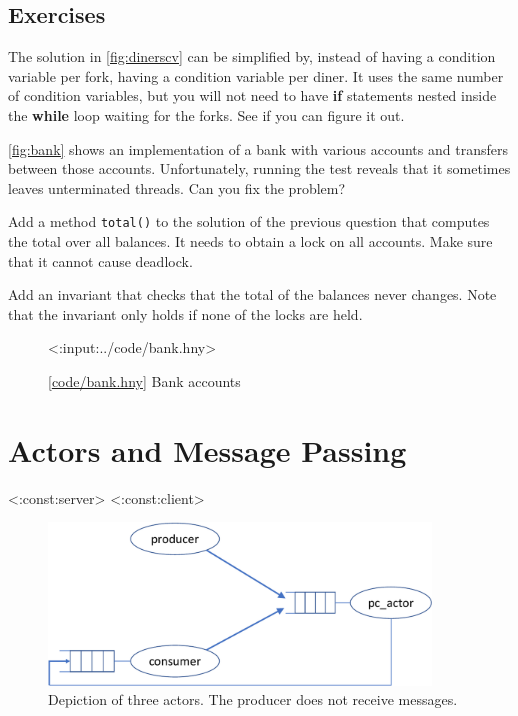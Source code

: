\documentclass{report}
\newcommand{\harmonylink}[1]{%
[\href{https://harmony.cs.cornell.edu/#1}{\underline{#1}}]%
}
\newenvironment{code}{
\tcolorbox
}{
\endtcolorbox
}
\begin{document}
{\section*{Exercises}
\begin{problems}
\item The solution in \autoref{fig:dinerscv} can be simplified by, instead
of having a condition variable per fork, having a condition variable per
diner.  It uses the same number of condition variables, but you will not
need to have \textbf{if} statements nested inside the \textbf{while} loop
waiting for the forks.  See if you can figure it out.
\item \label{ex:bank} \autoref{fig:bank} shows an implementation of a bank with various
accounts and transfers between those accounts.
Unfortunately, running the test reveals that it sometimes leaves unterminated
threads.  Can you fix the problem?
\item Add a method \texttt{total()} to the solution of the previous question
that computes the total over all balances.
It needs to obtain a lock on all accounts.  Make sure that
it cannot cause deadlock.
\item Add an invariant that checks that the total of the balances never
changes.  Note that the invariant only holds if none of the locks are
held.
\end{problems}

\begin{figure}
\begin{code}
<{:input:../code/bank.hny}>
\end{code}
\caption{\harmonylink{code/bank.hny} Bank accounts}
\label{fig:bank}
\end{figure}

\chapter{Actors and Message Passing}
\label{ch:actor}
%
%

<{:const:server}>
<{:const:client}>

%

\begin{figure}
\begin{center}
\includegraphics[width=4in]{figures/actor-crop.pdf}
\end{center}
\caption{Depiction of three actors.  The producer does not receive messages.}
\label{fig:actorpic}
\end{figure}

}
\end{document}
